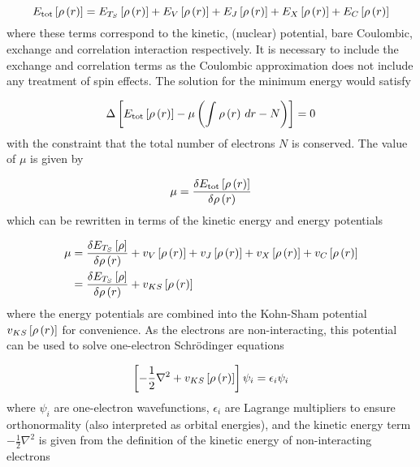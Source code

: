 \begin{equation}
    E_{\text{tot}} \left[ \rho\left(r\right) \right] = E_{T_S} \left[ \rho\left(r\right) \right] + E_{V} \left[ \rho\left(r\right) \right] + E_{J} \left[ \rho\left(r\right) \right] + E_{X} \left[ \rho\left(r\right) \right] + E_{C} \left[ \rho\left(r\right) \right]
\end{equation}
%
where these terms correspond to the kinetic, (nuclear) potential, bare Coulombic,
exchange and correlation interaction respectively. It is necessary to include the 
exchange and correlation terms as the Coulombic approximation does not include any
treatment of spin effects. The solution for the minimum energy would satisfy

\begin{equation}
    \Delta \left[  E_{\text{tot}} \left[ \rho\left(r\right) \right]  - \mu \left( \int_{}^{} \rho\left(r\right) \,dr - N \right) \right] = 0
\end{equation}
%
with the constraint that the total number of electrons $N$ is conserved. The value
of $\mu$ is given by

\begin{equation}
    \mu = \frac{\delta  E_{\text{tot}} \left[ \rho\left(r\right) \right]}{\delta \rho\left(r\right)}
\end{equation}
%
which can be rewritten in terms of the kinetic energy and energy potentials

\begin{equation}
    \begin{split}
        \mu &= \frac{\delta  E_{T_S} \left[ \rho \right]}{\delta \rho\left(r\right)} + v_{V} \left[ \rho\left(r\right) \right] + v_{J} \left[ \rho\left(r\right) \right] + v_{X} \left[ \rho\left(r\right) \right] + v_{C} \left[ \rho\left(r\right) \right] \\
            &= \frac{\delta  E_{T_S} \left[ \rho \right]}{\delta \rho\left(r\right)} + v_{KS} \left[ \rho\left(r\right) \right]
    \end{split}
\end{equation}
%
where the energy potentials are combined into the Kohn-Sham potential $v_{KS} \left[ \rho\left(r\right) \right]$ for
convenience. As the electrons are non-interacting, this potential can be used to
solve one-electron Schrödinger equations

\begin{equation}
    \left[ -\frac{1}{2} \nabla^2 + v_{KS} \left[ \rho\left(r\right) \right] \right] \psi_i = \epsilon_i \psi_i
\end{equation}
%
where $\psi_i$ are one-electron wavefunctions, $\epsilon_i$ are Lagrange multipliers
to ensure orthonormality (also interpreted as orbital energies), and the kinetic 
energy term $-\frac{1}{2} \nabla ^2$ is given from the definition of the kinetic 
energy of non-interacting electrons

